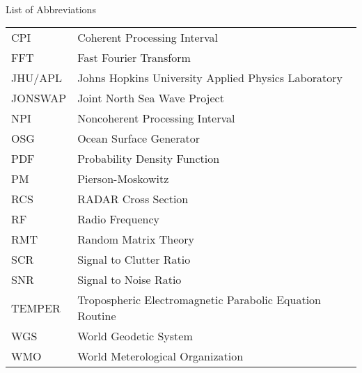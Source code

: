

\renewcommand{\baselinestretch}{1}
\small\normalsize
\hbox{\ }

\vspace{-4em}

\begin{center}
\large{List of Abbreviations}
\end{center} 

\vspace{3pt}

\begin{supertabular}{ll}
CPI & Coherent Processing Interval \\
FFT & Fast Fourier Transform \\
JHU/APL & Johns Hopkins University Applied Physics Laboratory \\
JONSWAP & Joint North Sea Wave Project\\
NPI & Noncoherent Processing Interval \\
OSG & Ocean Surface Generator \\
PDF & Probability Density Function \\
PM & Pierson-Moskowitz \\
RCS & RADAR Cross Section \\
RF & Radio Frequency \\
RMT & Random Matrix Theory \\
SCR & Signal to Clutter Ratio \\
SNR & Signal to Noise Ratio\\
TEMPER & Tropospheric Electromagnetic Parabolic Equation Routine \\
WGS & World Geodetic System \\
WMO & World Meterological Organization \\
\end{supertabular}
